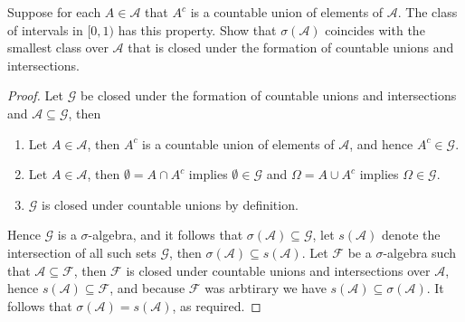 \documentclass[11pt]{article}
\newcommand{\F}{\mathcal{F}}
\newcommand{\A}{\mathcal{A}}
\newcommand{\G}{\mathcal{G}}
\newcommand{\seq}{\subseteq}
\newcommand{\Om}{\Omega}
\newcommand{\es}{\emptyset}
\newcommand{\un}{\cup}
\newcommand{\ic}{\cap}
\newenvironment{exercise}[2][Exercise]{\begin{trivlist}
\item[\hskip \labelsep {\bfseries #1}\hskip \labelsep {\bfseries #2.}]}{\end{trivlist}}
\begin{document}
\begin{exercise}{2.8}
    Suppose for each $A \in \A$ that $A^{c}$ is a countable union of elements of $\A$. The class of intervals in $[0, 1)$ has this property. Show that $\sigma (\A)$ coincides with the smallest class over $\A$ that is closed under the formation of countable unions and intersections.
\end{exercise}
\begin{proof}
    Let $\G$ be closed under the formation of countable unions and intersections and $\A \seq \G$, then
    \begin{enumerate}
        \item Let $A \in \A$, then $A^{c}$ is a countable union of elements of $\A$, and hence $A^{c} \in \G$.
        \item Let $A \in \A$, then $\es = A \ic A^{c}$ implies $\es \in \G$ and $\Om = A \un A^{c}$ implies $\Om \in \G$.
        \item $\G$ is closed under countable unions by definition.
    \end{enumerate}
    Hence $\G$ is a $\sigma$-algebra, and it follows that $\sigma (\A) \seq \G$, let $s(\A)$ denote the intersection of all such sets $\G$, then $\sigma (\A) \seq s(\A)$. Let $\F$ be a $\sigma$-algebra such that $\A \seq \F$, then $\F$ is closed under countable unions and intersections over $\A$, hence $s(\A) \seq \F$, and because $\F$ was arbtirary we have $s(\A) \seq \sigma(\A)$. It follows that $\sigma (\A) = s(\A)$, as required.
\end{proof}
\end{document}
